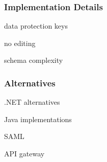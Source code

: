 \subsubsection{Implementation Details}

data protection keys

no editing

schema complexity

\subsubsection{Alternatives}

.NET alternatives

Java implementations

SAML

API gateway
